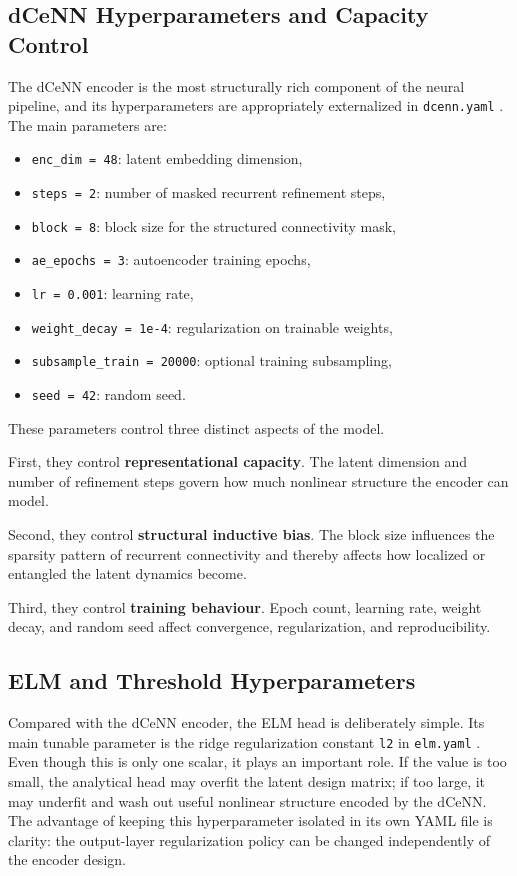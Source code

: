 \subsection{dCeNN Hyperparameters and Capacity Control}

The dCeNN encoder is the most structurally rich component of the neural pipeline, and its hyperparameters are appropriately externalized in \texttt{dcenn.yaml} \cite{repo_thesis_grid_anomaly}. The main parameters are:
\begin{itemize}
	\item \texttt{enc\_dim = 48}: latent embedding dimension,
	\item \texttt{steps = 2}: number of masked recurrent refinement steps,
	\item \texttt{block = 8}: block size for the structured connectivity mask,
	\item \texttt{ae\_epochs = 3}: autoencoder training epochs,
	\item \texttt{lr = 0.001}: learning rate,
	\item \texttt{weight\_decay = 1e-4}: regularization on trainable weights,
	\item \texttt{subsample\_train = 20000}: optional training subsampling,
	\item \texttt{seed = 42}: random seed.
\end{itemize}

These parameters control three distinct aspects of the model.

First, they control \textbf{representational capacity}. The latent dimension and number of refinement steps govern how much nonlinear structure the encoder can model.

Second, they control \textbf{structural inductive bias}. The block size influences the sparsity pattern of recurrent connectivity and thereby affects how localized or entangled the latent dynamics become.

Third, they control \textbf{training behaviour}. Epoch count, learning rate, weight decay, and random seed affect convergence, regularization, and reproducibility.

\subsection{ELM and Threshold Hyperparameters}

Compared with the dCeNN encoder, the ELM head is deliberately simple. Its main tunable parameter is the ridge regularization constant \texttt{l2} in \texttt{elm.yaml} \cite{repo_thesis_grid_anomaly}. Even though this is only one scalar, it plays an important role. If the value is too small, the analytical head may overfit the latent design matrix; if too large, it may underfit and wash out useful nonlinear structure encoded by the dCeNN. The advantage of keeping this hyperparameter isolated in its own YAML file is clarity: the output-layer regularization policy can be changed independently of the encoder design.

